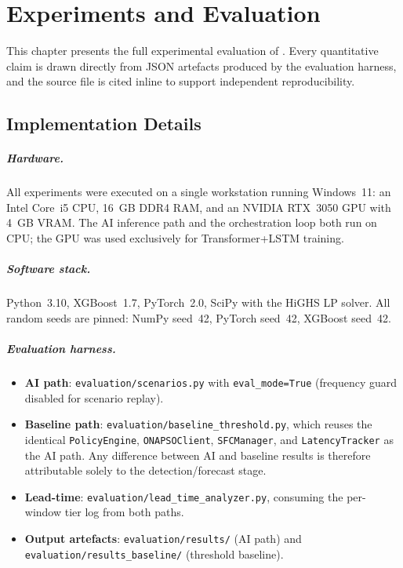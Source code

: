 \chapter{Experiments and Evaluation}
\label{ch:eval}

This chapter presents the full experimental evaluation of \padonap{}.
Every quantitative claim is drawn directly from JSON artefacts produced
by the evaluation harness, and the source file is cited inline to
support independent reproducibility.

\section{Implementation Details}
\label{sec:implementation}

\paragraph{Hardware.}
All experiments were executed on a single workstation running Windows~11:
an Intel Core~i5 CPU, 16~GB DDR4 RAM, and an NVIDIA RTX~3050 GPU with
4~GB VRAM. The AI inference path and the orchestration loop both run on
CPU; the GPU was used exclusively for Transformer+LSTM training.

\paragraph{Software stack.}
Python~3.10, XGBoost~1.7, PyTorch~2.0, SciPy with the HiGHS LP solver.
All random seeds are pinned: NumPy seed~42, PyTorch seed~42,
XGBoost seed~42.

\paragraph{Evaluation harness.}
\begin{itemize}
  \item \textbf{AI path}: \texttt{evaluation/scenarios.py} with
        \texttt{eval\_mode=True} (frequency guard disabled for scenario
        replay).
  \item \textbf{Baseline path}: \texttt{evaluation/baseline\_threshold.py},
        which reuses the identical \texttt{PolicyEngine},
        \texttt{ONAPSOClient}, \texttt{SFCManager}, and
        \texttt{LatencyTracker} as the AI path. Any difference between
        AI and baseline results is therefore attributable solely to the
        detection/forecast stage.
  \item \textbf{Lead-time}: \texttt{evaluation/lead\_time\_analyzer.py},
        consuming the per-window tier log from both paths.
  \item \textbf{Output artefacts}: \texttt{evaluation/results/} (AI path)
        and \texttt{evaluation/results\_baseline/} (threshold baseline).
\end{itemize}

